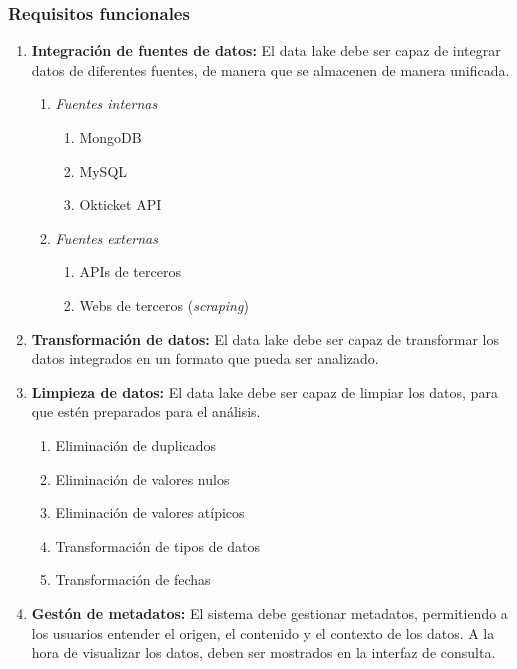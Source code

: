 \subsubsection{Requisitos funcionales}\label{subsubsec:funcionales}
\begin{enumerate}[label=RF\arabic*.]
	\item \textbf{Integración de fuentes de datos:} El data lake debe ser capaz de integrar datos
		de diferentes fuentes, de manera que se almacenen de manera unificada.
		\begin{enumerate}[label*=\arabic*.]
			\item \emph{Fuentes internas} \begin{enumerate}[label*=\arabic*.]
					\item MongoDB
					\item MySQL
					\item Okticket API
				\end{enumerate}
			\item \emph{Fuentes externas} \begin{enumerate}[label*=\arabic*.]
					\item APIs de terceros
					\item Webs de terceros (\textit{scraping})
				\end{enumerate}
		\end{enumerate}
	\item \textbf{Transformación de datos:} El data lake debe ser capaz de transformar los datos
		integrados en un formato que pueda ser analizado.
	\item \textbf{Limpieza de datos:} El data lake debe ser capaz de limpiar los datos, para que
		estén preparados para el análisis. \begin{enumerate}[label*=\arabic*.]
			\item Eliminación de duplicados
			\item Eliminación de valores nulos
			\item Eliminación de valores atípicos
			\item Transformación de tipos de datos
			\item Transformación de fechas
		\end{enumerate}
	\item \textbf{Gestón de metadatos:} El sistema debe gestionar metadatos, permitiendo a los
		usuarios entender el origen, el contenido y el contexto de los datos. A la hora de
		visualizar los datos, deben ser mostrados en la interfaz de consulta.
		\begin{enumerate}[label*=\arabic*.]

\end{enumerate}
\end{enumerate}
